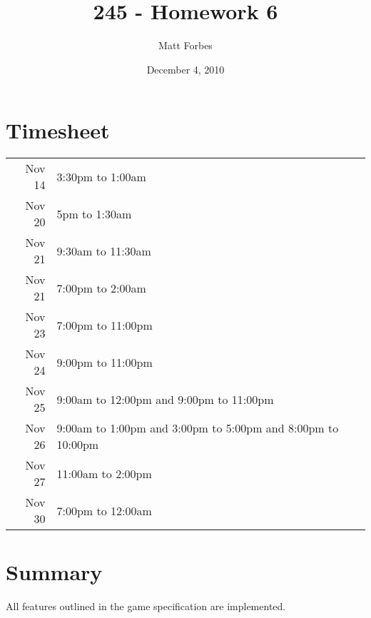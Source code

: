 \documentclass[a4paper,12pt]{article}
\begin{document}
\title{245 - Homework 6}
\author{Matt Forbes}
\date{December 4, 2010}
\maketitle

\pagebreak

\section*{Timesheet}

\begin{tabular}{r l}

  Nov 14 & 3:30pm to 1:00am\\

  Nov 20 & 5pm to 1:30am \\

  Nov 21 & 9:30am to 11:30am \\

  Nov 21 & 7:00pm to 2:00am \\

  Nov 23 & 7:00pm to 11:00pm \\

  Nov 24 & 9:00pm to 11:00pm \\

  Nov 25 & 9:00am to 12:00pm and 9:00pm to 11:00pm \\

  Nov 26 & 9:00am to 1:00pm and 3:00pm to 5:00pm and 8:00pm to 10:00pm \\

  Nov 27 & 11:00am to 2:00pm \\

  Nov 30 & 7:00pm to 12:00am
  
\end{tabular}

\section*{Summary}

All features outlined in the game specification are implemented.
\end{document}
